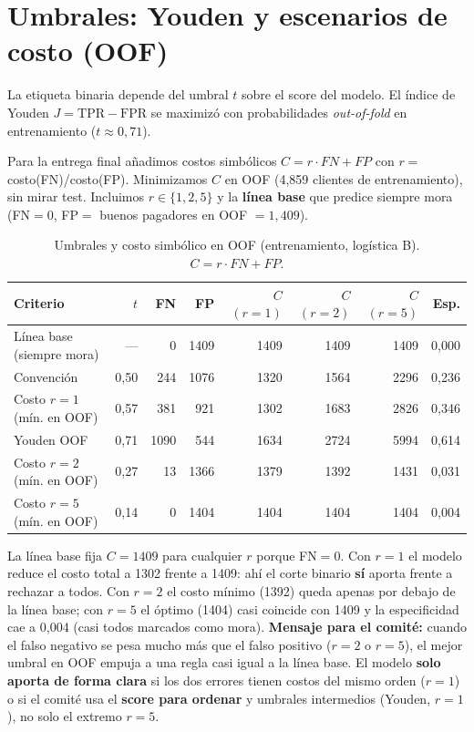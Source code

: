 \documentclass[11pt]{article}
\begin{document}
\section{Umbrales: Youden y escenarios de costo (OOF)}

La etiqueta binaria depende del umbral $t$ sobre el score del modelo. El índice de Youden $J = \mathrm{TPR} - \mathrm{FPR}$ se maximizó con probabilidades \emph{out-of-fold} en entrenamiento ($t \approx 0{,}71$).

Para la entrega final añadimos costos simbólicos $C = r \cdot FN + FP$ con $r =$ costo(FN)/costo(FP). Minimizamos $C$ en OOF (4{,}859 clientes de entrenamiento), sin mirar test. Incluimos $r \in \{1, 2, 5\}$ y la \textbf{línea base} que predice siempre mora (FN$=0$, FP$=$ buenos pagadores en OOF $=1{,}409$).

\begin{table}[H]
\centering
\caption{Umbrales y costo simbólico en OOF (entrenamiento, logística B). $C = r\cdot FN + FP$.}
\label{tab:costos_oof}
\footnotesize
\begin{tabular}{@{}lrrrrrrr@{}}
\toprule
\textbf{Criterio} & \textbf{$t$} & \textbf{FN} & \textbf{FP} & \textbf{$C$ $(r{=}1)$} & \textbf{$C$ $(r{=}2)$} & \textbf{$C$ $(r{=}5)$} & \textbf{Esp.} \\
\midrule
Línea base (siempre mora) & --- & 0 & 1409 & 1409 & 1409 & 1409 & 0,000 \\
Convención & 0,50 & 244 & 1076 & 1320 & 1564 & 2296 & 0,236 \\
Costo $r=1$ (mín. en OOF) & 0,57 & 381 & 921 & 1302 & 1683 & 2826 & 0,346 \\
Youden OOF & 0,71 & 1090 & 544 & 1634 & 2724 & 5994 & 0,614 \\
Costo $r=2$ (mín. en OOF) & 0,27 & 13 & 1366 & 1379 & 1392 & 1431 & 0,031 \\
Costo $r=5$ (mín. en OOF) & 0,14 & 0 & 1404 & 1404 & 1404 & 1404 & 0,004 \\
\bottomrule
\end{tabular}
\end{table}

La línea base fija $C = 1409$ para cualquier $r$ porque FN$=0$. Con $r=1$ el modelo reduce el costo total a 1302 frente a 1409: ahí el corte binario \textbf{sí} aporta frente a rechazar a todos. Con $r=2$ el costo mínimo (1392) queda apenas por debajo de la línea base; con $r=5$ el óptimo (1404) casi coincide con 1409 y la especificidad cae a 0,004 (casi todos marcados como mora). \textbf{Mensaje para el comité:} cuando el falso negativo se pesa mucho más que el falso positivo ($r=2$ o $r=5$), el mejor umbral en OOF empuja a una regla casi igual a la línea base. El modelo \textbf{solo aporta de forma clara} si los dos errores tienen costos del mismo orden ($r=1$) o si el comité usa el \textbf{score para ordenar} y umbrales intermedios (Youden, $r=1$), no solo el extremo $r=5$.
\end{document}
